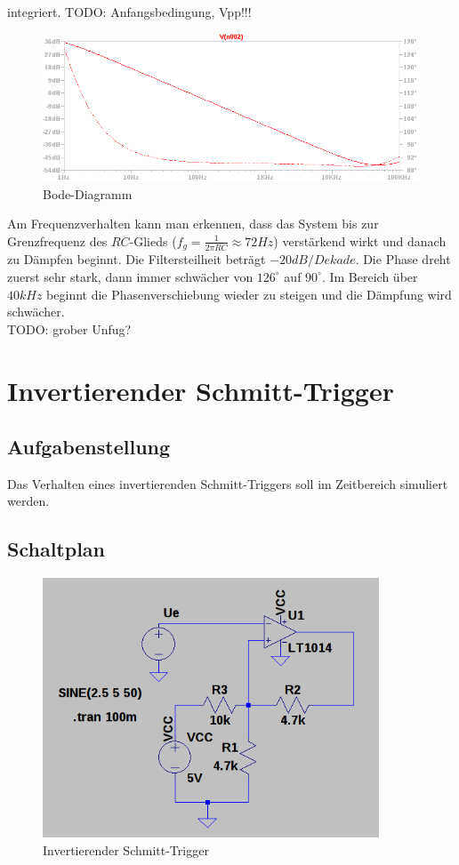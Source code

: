 \documentclass[12pt,a4paper,titlepage]{article}
\begin{document}
\noindent integriert. TODO: Anfangsbedingung, Vpp!!!


\begin{figure}[H]
  \centering
  \includegraphics[width=150mm]{integrierer_bode.png}
  \caption{Bode-Diagramm}
\end{figure}

\noindent Am Frequenzverhalten kann man erkennen, dass das System bis zur Grenzfrequenz des $RC$-Glieds ($f_g = \frac{1}{2\pi RC} \approx 72Hz$) verst\"arkend wirkt und danach zu D\"ampfen beginnt. Die Filtersteilheit betr\"agt $-20dB/Dekade$. Die Phase dreht zuerst sehr stark, dann immer schw\"acher von $126^{\circ}$ auf $90^{\circ}$. Im Bereich \"uber $40kHz$ beginnt die Phasenverschiebung wieder zu steigen und die D\"ampfung wird schw\"acher.\\

\noindent TODO: grober Unfug?

\section{Invertierender Schmitt-Trigger}

\subsection{Aufgabenstellung}
Das Verhalten eines invertierenden Schmitt-Triggers soll im Zeitbereich simuliert werden.

\subsection{Schaltplan}
\begin{figure}[H]
  \centering
  \includegraphics[width=100mm]{schmitt_schaltung.png}
  \caption{Invertierender Schmitt-Trigger}
\end{figure}
\end{document}
